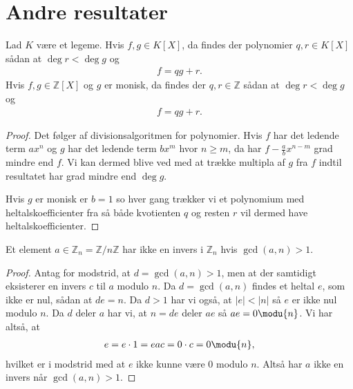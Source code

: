 \section{Andre resultater}
\begin{thm}
\label{monic}
Lad $K$ være et legeme. Hvis $f, g \in K[X]$, da findes der polynomier $q, r \in K[X]$ sådan at $\deg r < \deg g$ og
\begin{align*}
	f = qg + r.
\end{align*}
Hvis $f, g \in \mathbb{Z}[X]$ og $g$ er monisk, da findes der $q, r \in \mathbb{Z}$ sådan at $\deg r < \deg g$ og
\begin{align*}
	f = qg + r.
\end{align*}
\end{thm}
\begin{proof}
Det følger af divisionsalgoritmen for polynomier. Hvis $f$ har det ledende term $ax^n$ og $g$ har det ledende term $bx^m$ hvor $n \geq m$, da har $f - \frac{a}{b} x^{n-m}$ grad mindre end $f$. Vi kan dermed blive ved med at trække multipla af $g$ fra $f$ indtil resultatet har grad mindre end $\deg g$.

Hvis $g$ er monisk er $b=1$ so hver gang trækker vi et polynomium med heltalskoefficienter fra så både kvotienten $q$ og resten $r$ vil dermed have heltalskoefficienter.
\end{proof}
\label{appendiks_andre}

\begin{proposition}
\label{inverse_exists_not}
Et element $a \in \mathbb{Z}_n = \mathbb{Z}/n\mathbb{Z}$ har ikke en invers i $\mathbb{Z}_n$ hvis $\gcd(a, n) > 1$. 
\end{proposition}
\begin{proof}
Antag for modstrid, at $d = \gcd(a, n) > 1$, men at der samtidigt eksisterer en invers $c$ til $a$ modulo $n$. Da $d = \gcd(a, n)$ findes et heltal $e$, som ikke er nul, sådan at $de = n$. Da $d >1$ har vi også, at $|e| < |n|$ så $e$ er ikke nul modulo $n$. Da $d$ deler $a$ har vi, at $n = de$ deler $ae$ så $ae = 0 \modu{n}$. Vi har altså, at
\begin{align*}
	e = e \cdot 1 = eac = 0 \cdot c = 0 \modu{n},
\end{align*}
hvilket er i modstrid med at $e$ ikke kunne være $0$ modulo $n$. Altså har $a$ ikke en invers når $\gcd(a, n) > 1$.
\end{proof}